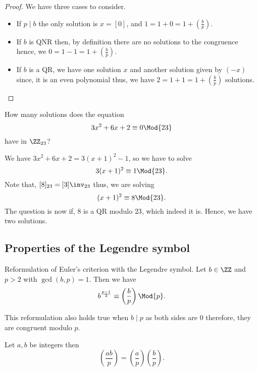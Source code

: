 \documentclass[12pt, a4paper]{article}
\begin{document}
\begin{proof}
    We have three cases to consider.
    \begin{itemize}
        \item If \(p \mid b\) the only solution is \(x =[0]\), and \(1 = 1+0 = 1 + \left( \frac{b}{p} \right)\).
        \item If \(b\) is QNR then, by definition there are no solutions to the congruence hence,  we \(0=1-1=1+\left( \frac{b}{p} \right)\).
        \item If \(b\) is a QR, we have one solution \(x\) and another solution given by \((-x)\) since, it is an even polynomial thus, we have \(2 = 1 +1=1+\left( \frac{b}{p} \right)\) solutions.
    \end{itemize}
\end{proof}

\begin{mdexample}
    How many solutions does the equation 
    \[3x^2+6x+2 \equiv 0 \Mod{23}\]
    have in \(\ZZ_{23}\)?
    \begin{solution}
        We have \(3x^2+6x+2 = 3(x+1)^2-1\), so we have to solve 
        \[3(x+1)^2 \equiv 1 \Mod{23}.\]
        Note that, \([8]_{23}=[3]\inv_{23}\) thus, we are solving 
        \[(x+1)^2 \equiv 8 \Mod{23}.\]
        The question is now if, \(8\) is a QR modulo \(23\), which indeed it is. Hence, we have two solutions.
    \end{solution}
\end{mdexample}

\subsection{Properties of the Legendre symbol}

\begin{theorem}
    Reformulation of Euler's criterion with the Legendre symbol. Let \(b \in \ZZ\) and \(p>2\) with \(\gcd(b,p)=1\). Then we have
    \[b^{\frac{p-1}{2}} \equiv \left( \frac{b}{p} \right) \Mod{p}.\]
\end{theorem}

\begin{mdremark}
    This reformulation also holds true when \(b \mid p\) as both sides are \(0\) therefore, they are congruent modulo \(p\).
\end{mdremark}

\begin{lemma}
    Let \(a,b\) be integers then
    \[\left( \frac{ab}{p} \right) = \left( \frac{a}{p} \right)\left( \frac{b}{p} \right).\]
\end{lemma}
\end{document}
